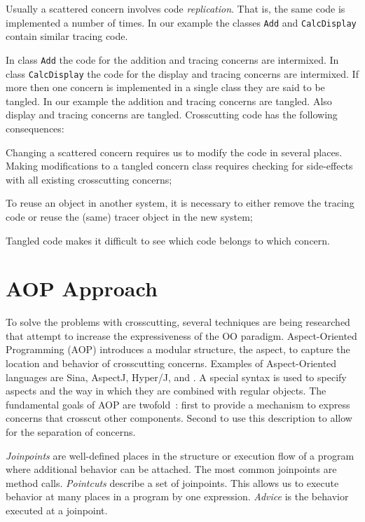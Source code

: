 Usually a scattered concern involves code \emph{replication}.
That is, the same code is implemented a number of times.
In our example the classes \lstinline|Add| and \lstinline|CalcDisplay| contain similar tracing code.

In class \lstinline|Add| the code for the addition and tracing concerns are intermixed.
In class \lstinline|CalcDisplay| the code for the display and tracing concerns are intermixed.
If more then one concern is implemented in a single class they are said to be tangled.
In our example the addition and tracing concerns are tangled.
Also display and tracing concerns are tangled.
Crosscutting code has the following consequences:
\begin{description}[style=nextline,noitemsep]
  \item[Code is difficult to change] Changing a scattered concern requires us to modify the code in several places.
Making modifications to a tangled concern class requires checking for side-effects with all existing crosscutting concerns;
  \item[Code is harder to reuse] To reuse an object in another system, it is necessary to either remove the tracing code or reuse the (same) tracer object in the new system;
  \item[Code is harder to understand] Tangled code makes it difficult to see which code belongs to which concern.
\end{description}

\section{AOP Approach}

To solve the problems with crosscutting, several techniques are being researched that attempt to increase the expressiveness of the OO paradigm.
Aspect-Oriented Programming (AOP) introduces a modular structure, the aspect, to capture the location and behavior of crosscutting concerns.
Examples of Aspect-Oriented languages are Sina, AspectJ, Hyper/J, and \Compose*.
A special syntax is used to specify aspects and the way in which they are combined with regular objects.
The fundamental goals of AOP are twofold~\cite{gradecki:maj03}: first to provide a mechanism to express concerns that crosscut other components.
Second to use this description to allow for the separation of concerns.

\emph{Joinpoints} are well-defined places in the structure or execution flow of a program where additional behavior can be attached.
The most common joinpoints are method calls.
\emph{Pointcuts} describe a set of joinpoints.
This allows us to execute behavior at many places in a program by one expression.
\emph{Advice} is the behavior executed at a joinpoint.

